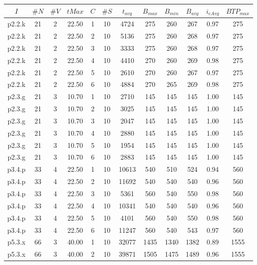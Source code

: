 \begin{center}
\begin{tabular}{ |c|c|c|c|c|c|c|c|c|c|c|c| } 
\hline
$I$ & $\#N$ & $\#V$ & $tMax$ & $C$ & $\#S$ & $t_{avg}$ & $B_{max}$ & $B_{min}$ & $B_{avg}$ & $i_{eAvg}$ & $BTP_{max}$ \\
\hline
p2.2.k & 21 & 2 & 22.50 & 1 & 10 & 4724 & 275 & 260 & 267 & 0.97 & 275  \\
p2.2.k & 21 & 2 & 22.50 & 2 & 10 & 5136 & 275 & 260 & 268 & 0.97 & 275  \\
p2.2.k & 21 & 2 & 22.50 & 3 & 10 & 3333 & 275 & 260 & 268 & 0.97 & 275  \\
p2.2.k & 21 & 2 & 22.50 & 4 & 10 & 4410 & 270 & 260 & 269 & 0.98 & 275  \\
p2.2.k & 21 & 2 & 22.50 & 5 & 10 & 2610 & 270 & 260 & 267 & 0.97 & 275  \\
p2.2.k & 21 & 2 & 22.50 & 6 & 10 & 4884 & 270 & 265 & 269 & 0.98 & 275  \\
p2.3.g & 21 & 3 & 10.70 & 1 & 10 & 2710 & 145 & 145 & 145 & 1.00 & 145  \\
p2.3.g & 21 & 3 & 10.70 & 2 & 10 & 3025 & 145 & 145 & 145 & 1.00 & 145  \\
p2.3.g & 21 & 3 & 10.70 & 3 & 10 & 2047 & 145 & 145 & 145 & 1.00 & 145  \\
p2.3.g & 21 & 3 & 10.70 & 4 & 10 & 2880 & 145 & 145 & 145 & 1.00 & 145  \\
p2.3.g & 21 & 3 & 10.70 & 5 & 10 & 1954 & 145 & 145 & 145 & 1.00 & 145  \\
p2.3.g & 21 & 3 & 10.70 & 6 & 10 & 2883 & 145 & 145 & 145 & 1.00 & 145  \\
p3.4.p & 33 & 4 & 22.50 & 1 & 10 & 10613 & 540 & 510 & 524 & 0.94 & 560  \\
p3.4.p & 33 & 4 & 22.50 & 2 & 10 & 11692 & 540 & 540 & 540 & 0.96 & 560  \\
p3.4.p & 33 & 4 & 22.50 & 3 & 10 & 5361 & 560 & 540 & 550 & 0.98 & 560  \\
p3.4.p & 33 & 4 & 22.50 & 4 & 10 & 10341 & 540 & 540 & 540 & 0.96 & 560  \\
p3.4.p & 33 & 4 & 22.50 & 5 & 10 & 4101 & 560 & 540 & 550 & 0.98 & 560  \\
p3.4.p & 33 & 4 & 22.50 & 6 & 10 & 11247 & 560 & 540 & 543 & 0.97 & 560  \\
p5.3.x & 66 & 3 & 40.00 & 1 & 10 & 32077 & 1435 & 1340 & 1382 & 0.89 & 1555  \\
p5.3.x & 66 & 3 & 40.00 & 2 & 10 & 39871 & 1505 & 1475 & 1489 & 0.96 & 1555  \\

\end{tabular}
\end{center}
